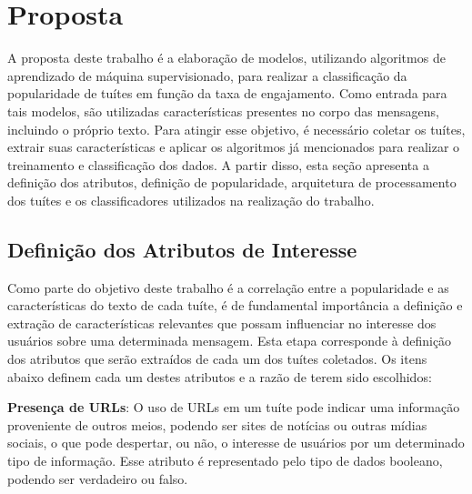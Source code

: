 \documentclass[oneside,openright,12pt]{ufsm_2015} %
\begin{document}

\chapter{Proposta}
\label{sec:proposta}

    \par A proposta deste trabalho é a elaboração de modelos, utilizando algoritmos de aprendizado de máquina supervisionado, para realizar a classificação da popularidade de tuítes em função da taxa de engajamento. Como entrada para tais modelos, são utilizadas características presentes no corpo das mensagens, incluindo o próprio texto. Para atingir esse objetivo, é necessário coletar os tuítes, extrair suas características e aplicar os algoritmos já mencionados para realizar o treinamento e classificação dos dados. A partir disso, esta seção apresenta a definição dos atributos, definição de popularidade, arquitetura de processamento dos tuítes e os classificadores utilizados na realização do trabalho.


\section{Definição dos Atributos de Interesse}
\label{sec:prop-def-atributos}

    \par Como parte do objetivo deste trabalho é a correlação entre a popularidade e as características do texto de cada tuíte, é de fundamental importância a definição e extração de características relevantes que possam influenciar no interesse dos usuários sobre uma determinada mensagem. Esta etapa corresponde à definição dos atributos que serão extraídos de cada um dos tuítes coletados. Os itens abaixo definem cada um destes atributos e a razão de terem sido escolhidos:

    \par \textbf{Presença de URLs}: O uso de URLs em um tuíte pode indicar uma informação proveniente de outros meios, podendo ser sites de notícias ou outras mídias sociais, o que pode despertar, ou não, o interesse de usuários por um determinado tipo de informação. Esse atributo é representado pelo tipo de dados booleano, podendo ser verdadeiro ou falso.
\end{document}
